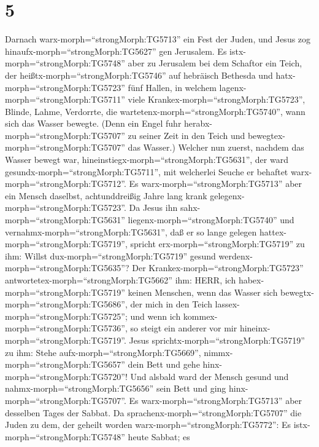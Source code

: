 \hypertarget{section-4}{%
\section{5}\label{section-4}}

 Darnach warx-morph=``strongMorph:TG5713'' ein Fest der
Juden, und Jesus zog hinaufx-morph=``strongMorph:TG5627'' gen Jerusalem.
 Es istx-morph=``strongMorph:TG5748'' aber zu Jerusalem bei
dem Schaftor ein Teich, der heißtx-morph=``strongMorph:TG5746'' auf
hebräisch Bethesda und hatx-morph=``strongMorph:TG5723'' fünf Hallen,
 in welchem lagenx-morph=``strongMorph:TG5711'' viele
Krankex-morph=``strongMorph:TG5723'', Blinde, Lahme, Verdorrte, die
wartetenx-morph=``strongMorph:TG5740'', wann sich das Wasser bewegte.
 (Denn ein Engel fuhr herabx-morph=``strongMorph:TG5707'' zu
seiner Zeit in den Teich und bewegtex-morph=``strongMorph:TG5707'' das
Wasser.) Welcher nun zuerst, nachdem das Wasser bewegt war,
hineinstiegx-morph=``strongMorph:TG5631'', der ward
gesundx-morph=``strongMorph:TG5711'', mit welcherlei Seuche er behaftet
warx-morph=``strongMorph:TG5712''.  Es
warx-morph=``strongMorph:TG5713'' aber ein Mensch daselbst,
achtunddreißig Jahre lang krank gelegenx-morph=``strongMorph:TG5723''.
 Da Jesus ihn sahx-morph=``strongMorph:TG5631''
liegenx-morph=``strongMorph:TG5740'' und
vernahmx-morph=``strongMorph:TG5631'', daß er so lange gelegen
hattex-morph=``strongMorph:TG5719'', spricht
erx-morph=``strongMorph:TG5719'' zu ihm: Willst
dux-morph=``strongMorph:TG5719'' gesund
werdenx-morph=``strongMorph:TG5635''?  Der
Krankex-morph=``strongMorph:TG5723''
antwortetex-morph=``strongMorph:TG5662'' ihm: HERR, ich
habex-morph=``strongMorph:TG5719'' keinen Menschen, wenn das Wasser sich
bewegtx-morph=``strongMorph:TG5686'', der mich in den Teich
lassex-morph=``strongMorph:TG5725''; und wenn ich
kommex-morph=``strongMorph:TG5736'', so steigt ein anderer vor mir
hineinx-morph=``strongMorph:TG5719''.  Jesus
sprichtx-morph=``strongMorph:TG5719'' zu ihm: Stehe
aufx-morph=``strongMorph:TG5669'', nimmx-morph=``strongMorph:TG5657''
dein Bett und gehe hinx-morph=``strongMorph:TG5720''!  Und
alsbald ward der Mensch gesund und nahmx-morph=``strongMorph:TG5656''
sein Bett und ging hinx-morph=``strongMorph:TG5707''. Es
warx-morph=``strongMorph:TG5713'' aber desselben Tages der Sabbat.
 Da sprachenx-morph=``strongMorph:TG5707'' die Juden zu
dem, der geheilt worden warx-morph=``strongMorph:TG5772'': Es
istx-morph=``strongMorph:TG5748'' heute Sabbat; es
